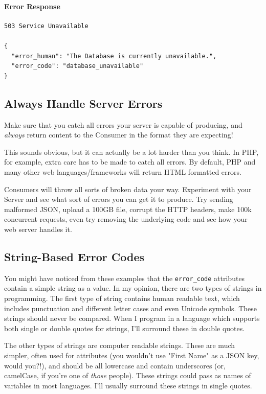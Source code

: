 \documentclass{book}
\begin{document}
\paragraph{\textbf{Error Response}}

\begin{verbatim}
503 Service Unavailable

{
  "error_human": "The Database is currently unavailable.",
  "error_code": "database_unavailable"
}
\end{verbatim}

\subsection{Always Handle Server Errors}

Make sure that you catch all errors your server is capable of producing, and \emph{always} return content to the Consumer in the format they are expecting!

This sounds obvious, but it can actually be a lot harder than you think. In PHP, for example, extra care has to be made to catch all errors. By default, PHP and many other web languages/frameworks will return HTML formatted errors.

Consumers will throw all sorts of broken data your way. Experiment with your Server and see what sort of errors you can get it to produce. Try sending malformed JSON, upload a 100GB file, corrupt the HTTP headers, make 100k concurrent requests, even try removing the underlying code and see how your web server handles it.

\subsection{String-Based Error Codes}

You might have noticed from these examples that the \texttt{error\_code} attributes contain a simple string as a value. In my opinion, there are two types of strings in programming. The first type of string contains human readable text, which includes punctuation and different letter cases and even Unicode symbols. These strings should never be compared. When I program in a language which supports both single or double quotes for strings, I'll surround these in double quotes.

The other types of strings are computer readable strings. These are much simpler, often used for attributes (you wouldn't use "First Name" as a JSON key, would you?!), and should be all lowercase and contain underscores (or, camelCase, if you're one of \emph{those} people). These strings could pass as names of variables in most languages. I'll usually surround these strings in single quotes.
\end{document}
